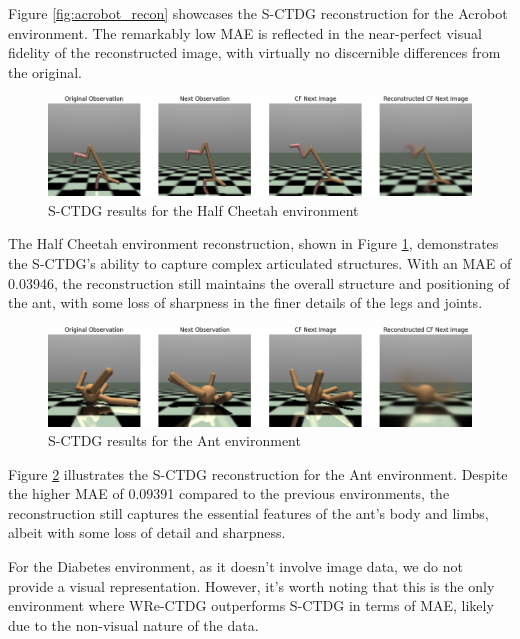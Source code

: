 Figure \ref{fig:acrobot_recon} showcases the S-CTDG reconstruction
for the Acrobot environment. The remarkably low MAE
is reflected in the near-perfect visual fidelity of the reconstructed image,
with virtually no discernible differences from the original.

\begin{figure}[h]
    \centering
    \includegraphics[width=\textwidth]{figures/ch5/e2e_half.png}
    \caption{S-CTDG results for the Half Cheetah environment}
    \label{fig:half_cheetah_recon}
\end{figure}

The Half Cheetah environment reconstruction,
shown in Figure \ref{fig:half_cheetah_recon},
demonstrates the S-CTDG's ability to capture complex articulated structures.
With an MAE of 0.03946, the reconstruction still maintains
the overall structure and positioning of the ant, with some loss of
sharpness in the finer details of the legs and joints.

\begin{figure}[h]
    \centering
    \includegraphics[width=\textwidth]{figures/ch5/e2e_ant.png}
    \caption{S-CTDG results for the Ant environment}
    \label{fig:ant_recon}
\end{figure}

Figure \ref{fig:ant_recon} illustrates the S-CTDG reconstruction
for the Ant environment. Despite the higher MAE of 0.09391 compared
to the previous environments, the reconstruction still captures
the essential features of the ant's body and limbs, albeit with
some loss of detail and sharpness.

For the Diabetes environment, as it doesn't involve image data, we do not provide a visual representation. However, it's worth noting that this is the only environment where WRe-CTDG outperforms S-CTDG in terms of MAE, likely due to the non-visual nature of the data.

